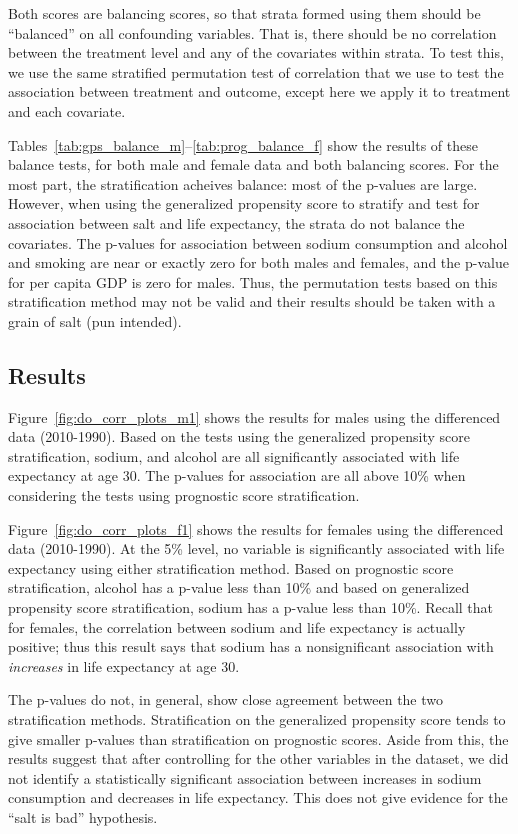 \documentclass[11pt]{article}\usepackage[]{graphicx}\usepackage[]{color}
\begin{document}
Both scores are balancing scores, so that strata formed using them should be ``balanced'' on all confounding variables.
That is, there should be no correlation between the treatment level and any of the covariates within strata.
To test this, we use the same stratified permutation test of correlation that we use to test the association between treatment and outcome, except here we apply it to treatment and each covariate.

Tables~\ref{tab:gps_balance_m}--\ref{tab:prog_balance_f} show the results of these balance tests, for both male and female data and both balancing scores.
For the most part, the stratification acheives balance: most of the p-values are large.
However, when using the generalized propensity score to stratify and test for association between salt and life expectancy, the strata do not balance the covariates.
The p-values for association between sodium consumption and alcohol and smoking are near or exactly zero for both males and females, and the p-value for per capita GDP is zero for males.
Thus, the permutation tests based on this stratification method may not be valid and their results should be taken with a grain of salt (pun intended).

\subsection{Results}
Figure~\ref{fig:do_corr_plots_m1} shows the results for males using the differenced data (2010-1990).
Based on the tests using the generalized propensity score stratification, sodium, and alcohol are all significantly associated with life expectancy at age 30.
The p-values for association are all above 10\% when considering the tests using prognostic score stratification.

Figure~\ref{fig:do_corr_plots_f1} shows the results for females using the differenced data (2010-1990).
At the 5\% level, no variable is significantly associated with life expectancy using either stratification method.
Based on prognostic score stratification, alcohol has a p-value less than 10\% and 
based on generalized propensity score stratification, sodium has a p-value less than 10\%.
Recall that for females, the correlation between sodium and life expectancy is actually positive; 
thus this result says that sodium has a nonsignificant association with \textit{increases} in life expectancy at age 30.

The p-values do not, in general, show close agreement between the two stratification methods.
Stratification on the generalized propensity score tends to give smaller p-values than stratification on prognostic scores.
Aside from this, the results suggest that after controlling for the other variables in the dataset, we did not identify a statistically significant association between increases in sodium consumption and decreases in life expectancy.
This does not give evidence for the ``salt is bad'' hypothesis.
\end{document}
